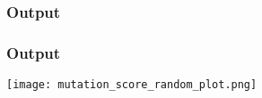   \begin{frame}
    \frametitle{Output}
    \centering
    {\tiny }
  \end{frame}

  \begin{frame}
    \frametitle{Output}
    \centering
    \texttt{[image: mutation\_score\_random\_plot.png]}
  \end{frame}
